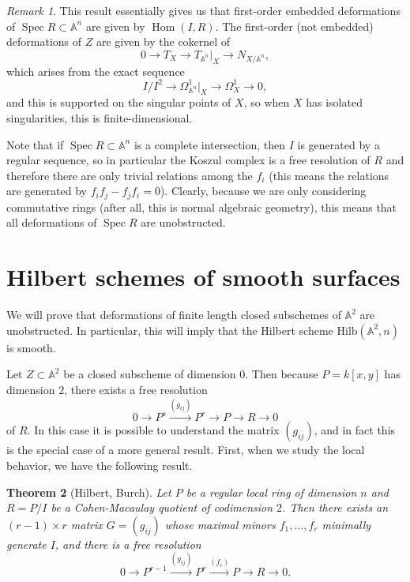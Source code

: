 \documentclass[leqno, openany]{memoir}
\newtheorem{thm}{Theorem}[section]
\theoremstyle{definition}
\theoremstyle{remark}
\newtheorem{rmk}[thm]{Remark}
\theoremstyle{plain}
\theoremstyle{definition}
\theoremstyle{remark}
\newcommand{\A}{\mathbb{A}}
\newcommand{\mr}[1]{\mathrm{#1}}
\DeclareMathOperator{\Hom}{Hom}
\DeclareMathOperator{\Spec}{Spec}
\begin{document}
\begin{rmk}
    This result essentially gives us that first-order embedded deformations of $\Spec R \subset \A^n$ are given by $\Hom(I, R)$. The first-order (not embedded) deformations of $Z$ are given by the cokernel of
    \[ 0 \to T_X \to T_{\A^n}|_X \to N_{X/\A^n}, \]
    which arises from the exact sequence
    \[ I/I^2 \to \Omega^1_{\A^n}|_X \to \Omega^1_X \to 0, \]
    and this is supported on the singular points of $X$, so when $X$ has isolated singularities, this is finite-dimensional.
\end{rmk}

Note that if $\Spec R \subset \A^n$ is a complete intersection, then $I$ is generated by a regular sequence, so in particular the Koszul complex is a free resolution of $R$ and therefore there are only trivial relations among the $f_i$ (this means the relations are generated by $f_i f_j - f_j f_i = 0$). Clearly, because we are only considering commutative rings (after all, this is normal algebraic geometry), this means that all deformations of $\Spec R$ are unobstructed.

\section{Hilbert schemes of smooth surfaces}%
\label{sec:hilbert_schemes_of_smooth_surfaces}

We will prove that deformations of finite length closed subschemes of $\A^2$ are unobstructed. In particular, this will imply that the Hilbert scheme $\mr{Hilb}(\A^2, n)$ is smooth.

Let $Z \subset \A^2$ be a closed subscheme of dimension $0$. Then because $P = k[x,y]$ has dimension $2$, there exists a free resolution
\[ 0 \to P^s \xrightarrow{(g_{ij})} P^r \to P \to R \to 0 \]
of $R$. In this case it is possible to understand the matrix $(g_{ij})$, and in fact this is the special case of a more general result. First, when we study the local behavior, we have the following result.
\begin{thm}[Hilbert, Burch]
    Let $P$ be a regular local ring of dimension $n$ and $R = P/I$ be a Cohen-Macaulay quotient of codimension $2$. Then there exists an $(r-1) \times r$ matrix $G = (g_{ij})$ whose maximal minors $f_1, \ldots, f_r$ minimally generate $I$, and there is a free resolution
    \[ 0 \to P^{r-1} \xrightarrow{(g_{ij})} P^r \xrightarrow{(f_i)} P \to R \to 0. \]
\end{thm}
\end{document}
